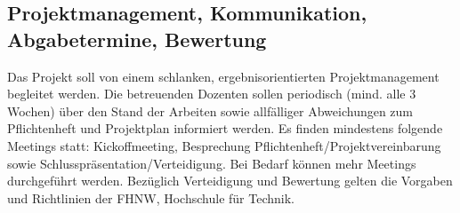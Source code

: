 \newpage

\subsection{Projektmanagement, Kommunikation, Abgabetermine, Bewertung}

Das Projekt soll von einem schlanken, ergebnisorientierten Projektmanagement begleitet werden. 
Die betreuenden Dozenten sollen periodisch (mind. alle 3 Wochen) über den Stand der Arbeiten sowie allfälliger Abweichungen zum Pflichtenheft und Projektplan informiert werden.
Es finden mindestens folgende Meetings statt: Kickoffmeeting, Besprechung Pflichtenheft/Projektvereinbarung sowie Schlusspräsentation/Verteidigung. 
Bei Bedarf können mehr Meetings durchgeführt werden.
Bezüglich Verteidigung und Bewertung gelten die Vorgaben und Richtlinien der FHNW, Hochschule für Technik.

\newpage

